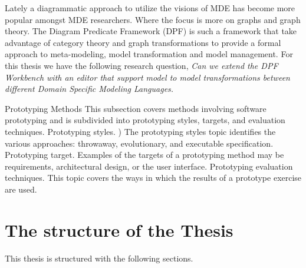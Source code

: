 Lately a diagrammatic approach to utilize the visions of MDE has become more
popular amongst MDE researchers. Where the focus is more on graphs and graph
theory. The Diagram Predicate Framework (DPF) is such a framework that take
advantage of category theory and graph transformations to provide a formal
approach to meta-modeling, model transformation and model management. For this
thesis we have the following research question, \textit{Can we extend the DPF
Workbench with an editor that support model to model transformations between
different Domain Specific Modeling Languages.}

Prototyping Methods
This subsection covers methods involving software
prototyping and is subdivided into prototyping styles,
targets, and evaluation techniques.
Prototyping styles.  ) The
prototyping styles topic identifies the various
approaches: throwaway, evolutionary, and executable
specification.
Prototyping target. Examples of the
targets of a prototyping method may be requirements,
architectural design, or the user interface.
Prototyping evaluation techniques. This topic covers
the ways in which the results of a prototype exercise
are used.

\section{The structure of the Thesis}

This thesis is structured with the following sections.

